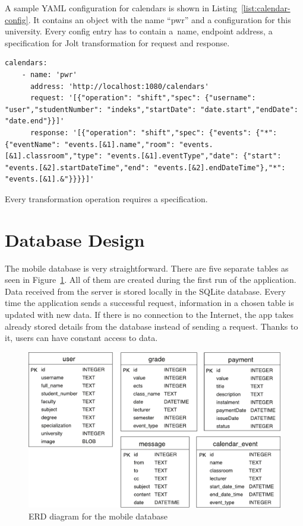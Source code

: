 A sample YAML configuration for calendars is shown in Listing~\ref{list:calendar-config}. It contains an object with the name ``pwr'' and a configuration for this university. Every config entry has to contain a~name, endpoint address, a specification for Jolt transformation for request and response.

\begin{lstlisting}[label=list:calendar-config,caption=Sample YAML configuration for calendars, basicstyle=\footnotesize\ttfamily, breaklines=true]
calendars:
    - name: 'pwr'
      address: 'http://localhost:1080/calendars'
      request: '[{"operation": "shift","spec": {"username": "user","studentNumber": "indeks","startDate": "date.start","endDate": "date.end"}}]'
      response: '[{"operation": "shift","spec": {"events": {"*": {"eventName": "events.[&1].name","room": "events.[&1].classroom","type": "events.[&1].eventType","date": {"start": "events.[&2].startDateTime","end": "events.[&2].endDateTime"},"*": "events.[&1].&"}}}}]'
\end{lstlisting}

Every transformation operation requires a specification.


\section{Database Design}
The mobile database is very straightforward. There are five separate tables as seen in Figure~\ref{fig:erd-diagram}. All of them are created during the first run of the application. Data received from the server is stored locally in the SQLite database. Every time the application sends a successful request, information in a chosen table is updated with new data. If there is no connection to the Internet, the app takes already stored details from the database instead of sending a request. Thanks to it, users can have constant access to data.
\begin{figure}[htb]
    \centering
    \includegraphics[scale=0.7]{fig03/erd_diagram.pdf}
    \caption{ERD diagram for the mobile database}
    \label{fig:erd-diagram}
\end{figure}

